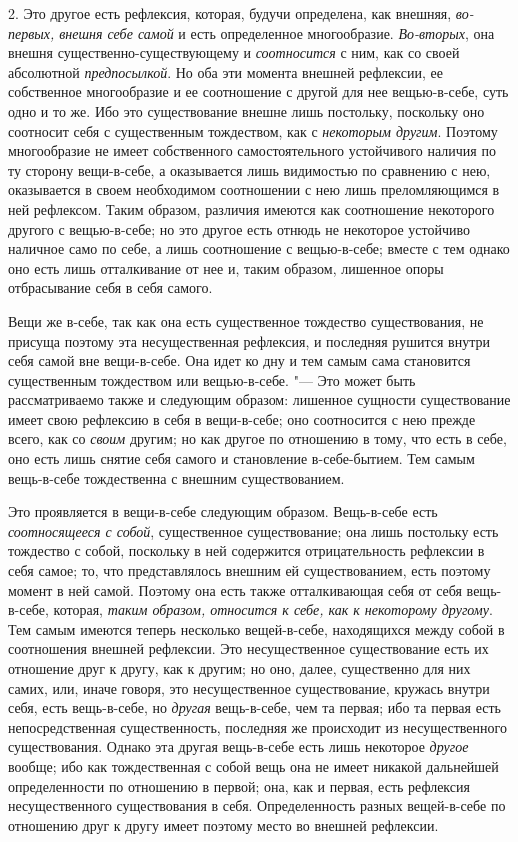 2. Это другое есть рефлексия, которая, будучи определена, как внешняя,
{\em во-первых, внешня себе самой} и есть определенное многообразие.
{\em Во-вторых}, она внешня существенно-существующему и
{\em соотносится} с ним, как со своей абсолютной
{\em предпосылкой}. Но оба эти момента внешней
рефлексии, ее собственное многообразие и ее соотношение с другой для нее
вещью-в-себе, суть одно и то же. Ибо это существование внешне лишь
постольку, поскольку оно соотносит себя с существенным тождеством, как с
{\em некоторым другим}. Поэтому многообразие не имеет
собственного самостоятельного устойчивого наличия по ту сторону
вещи-в-себе, а оказывается лишь видимостью по сравнению с нею, оказывается
в своем необходимом соотношении с нею лишь преломляющимся в ней рефлексом.
Таким образом, различия имеются как соотношение некоторого другого с
вещью-в-себе; но это другое есть отнюдь не некоторое устойчиво наличное
само по себе, а лишь соотношение с вещью-в-себе; вместе с тем однако оно
есть лишь отталкивание от нее и, таким образом, лишенное опоры отбрасывание
себя в себя самого.

Вещи же в-себе, так как она есть существенное тождество существования, не
присуща поэтому эта несущественная рефлексия, и последняя рушится внутри
себя самой вне вещи-в-себе. Она идет ко дну и тем самым сама становится
существенным тождеством или вещью-в-себе. "--- Это может быть рассматриваемо
также и следующим образом: лишенное сущности существование имеет свою
рефлексию в себя в вещи-в-себе; оно соотносится с нею прежде всего, как со
{\em своим} другим; но как другое по отношению в тому,
что есть в себе, оно есть лишь снятие себя самого и становление
в-себе-бытием. Тем самым вещь-в-себе тождественна с внешним существованием.

Это проявляется в вещи-в-себе следующим образом. Вещь-в-себе есть
{\em соотносящееся с собой}, существенное
существование; она лишь постольку есть тождество с собой, поскольку в ней
содержится отрицательность рефлексии в себя самое; то, что представлялось
внешним ей существованием, есть поэтому момент в ней самой. Поэтому она
есть также отталкивающая себя от себя вещь-в-себе, которая,
{\em таким образом, относится к себе, как к некоторому
другому}. Тем самым имеются теперь несколько вещей-в-себе, находящихся
между собой в соотношения внешней рефлексии. Это несущественное
существование есть их отношение друг к другу, как к другим; но оно, далее,
существенно для них самих, или, иначе говоря, это несущественное
существование, кружась внутри себя, есть вещь-в-себе, но
{\em другая} вещь-в-себе, чем та первая; ибо та первая
есть непосредственная существенность, последняя же происходит из
несущественного существования. Однако эта другая вещь-в-себе есть лишь
некоторое {\em другое} вообще; ибо как тождественная с
собой вещь она не имеет никакой дальнейшей определенности по отношению в
первой; она, как и первая, есть рефлексия несущественного существования в
себя. Определенность разных вещей-в-себе по отношению друг к другу имеет
поэтому место во внешней рефлексии.

